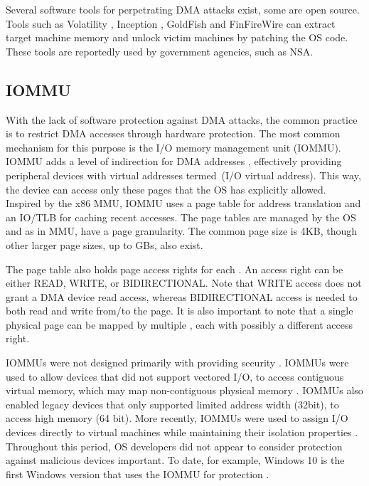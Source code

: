 Several software tools for perpetrating DMA attacks exist, some are open source. Tools such as Volatility \cite{Vol}, Inception \cite{MM}, GoldFish \cite{GA10} and FinFireWire \cite{Fin14} can extract target machine memory and unlock victim machines by patching the OS code. These tools are reportedly used by government agencies, such as NSA.

\subsection{IOMMU}

With the lack of software protection against DMA attacks, the common practice is to restrict DMA accesses through hardware protection. The most common mechanism for this purpose is the I/O memory management unit (IOMMU). IOMMU adds a level of indirection for DMA addresses \cite{WRC08,YZ15,SB12,MTF12}, effectively providing peripheral devices with virtual addresses termed~\iova(I/O virtual address). This way, the device can access only these pages that the OS has explicitly allowed. Inspired by the x86 MMU, IOMMU uses a page table for address translation and an IO/TLB for caching recent accesses.  The page tables are managed by the OS and as in MMU, have a page granularity. The common page size is 4KB, though other larger page sizes, up to GBs, also exist.

The page table also holds page access rights for each \iova. An access right can be either READ, WRITE, or BIDIRECTIONAL. Note that WRITE access does not grant a DMA device read access, whereas BIDIRECTIONAL access is needed to both read and write from/to the page. It is also important to note that a single physical page can be mapped by multiple \iova, each with possibly a different access right.

IOMMUs were not designed primarily with providing security \cite{DWT79}. IOMMUs were used to allow devices that did not support vectored I/O, to access contiguous virtual memory, which may map non-contiguous physical memory \cite{Chu96, WMM97}. IOMMUs also enabled legacy devices that only supported limited address width (32bit), to access high memory (64 bit). More recently, IOMMUs were used to assign I/O devices directly to virtual machines while maintaining their isolation properties \cite{Int16b, AMD16}. Throughout this period, OS developers did not appear to consider protection against malicious devices important. To date, for example, Windows 10 is the first Windows version that uses the IOMMU for protection \cite{Mic17}.

